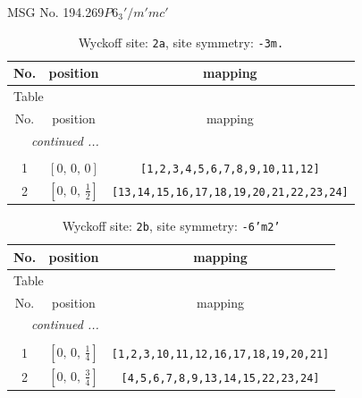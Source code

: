 \documentclass[fleqn,8pt]{jsarticle}
\begin{document}
\setcounter{MaxMatrixCols}{32}

\renewcommand{\tablename}{Table~}
\renewcommand{\figurename}{Figure~}
\begin{center}
\LARGE
MSG No. 194.269\quad$P6_{3}'/m'mc'$
\end{center}
\renewcommand{\arraystretch}{1.2}
\begin{longtable}{ccc}
\caption{Wyckoff site: {\tt 2a}, site symmetry: {\tt -3m.}}
 \\
 \hline \hline
No. & position & mapping \\ \hline \endfirsthead

\multicolumn{2}{l}{\tablename\ \thetable{}} \\
 \hline \hline
No. & position & mapping \\ \hline \endhead

 \hline \hline
\multicolumn{2}{r}{\footnotesize\it continued ...} \\ \endfoot

 \hline \hline
\multicolumn{2}{r}{} \\ \endlastfoot

1 & $\left[ 0,\, 0,\, 0 \right]$ & {\tt [1,2,3,4,5,6,7,8,9,10,11,12]} \\ \hline
2 & $\left[ 0,\, 0,\, \frac{1}{2} \right]$ & {\tt [13,14,15,16,17,18,19,20,21,22,23,24]} \\
\end{longtable}
\renewcommand{\arraystretch}{1.2}
\begin{longtable}{ccc}
\caption{Wyckoff site: {\tt 2b}, site symmetry: {\tt -6'm2'}}
 \\
 \hline \hline
No. & position & mapping \\ \hline \endfirsthead

\multicolumn{2}{l}{\tablename\ \thetable{}} \\
 \hline \hline
No. & position & mapping \\ \hline \endhead

 \hline \hline
\multicolumn{2}{r}{\footnotesize\it continued ...} \\ \endfoot

 \hline \hline
\multicolumn{2}{r}{} \\ \endlastfoot

1 & $\left[ 0,\, 0,\, \frac{1}{4} \right]$ & {\tt [1,2,3,10,11,12,16,17,18,19,20,21]} \\ \hline
2 & $\left[ 0,\, 0,\, \frac{3}{4} \right]$ & {\tt [4,5,6,7,8,9,13,14,15,22,23,24]} \\
\end{longtable}
\end{document}
